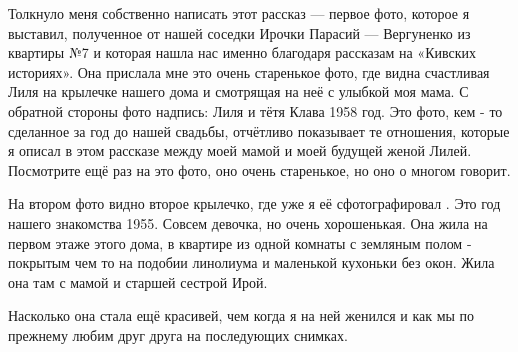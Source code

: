 Толкнуло  меня собственно  написать этот рассказ — первое  фото, которое я
выставил, полученное  от нашей соседки Ирочки Парасий — Вергуненко  из
квартиры №7 и которая нашла нас именно благодаря рассказам на  «Кивских
историях». Она прислала мне это  очень старенькое фото, где  видна счастливая
Лиля на крылечке нашего дома и смотрящая на неё  с улыбкой моя мама. С обратной
стороны фото надпись: Лиля  и тётя Клава 1958 год.  Это фото, кем - то
сделанное за год до нашей свадьбы,  отчётливо показывает те отношения, которые
я описал в этом рассказе между моей мамой и моей будущей женой Лилей.
Посмотрите ещё раз на это фото, оно очень старенькое, но оно  о многом говорит. 

На втором фото видно второе крылечко, где  уже я её сфотографировал . Это год
нашего знакомства 1955. Совсем девочка, но очень  хорошенькая. Она жила на
первом этаже этого дома, в квартире  из одной комнаты с земляным полом  -
покрытым чем то на подобии линолиума и маленькой кухоньки  без окон.   Жила она
там с мамой и старшей сестрой Ирой.

Насколько  она стала ещё красивей, чем когда я на ней женился  и как мы   по
прежнему любим друг друга  на последующих снимках.
